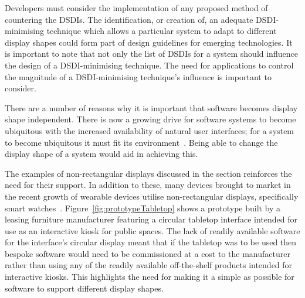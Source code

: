 \documentclass{bmcart}
\begin{document}
Developers must consider the implementation of any proposed method of countering the \acp{DSDI}.
The identification, or creation of, an adequate \ac{DSDI}-minimising technique which allows a particular system to adapt to different display shapes could form part of design guidelines for emerging technologies.
It is important to note that not only the list of \acp{DSDI} for a system should influence the design of a \ac{DSDI}-minimising technique.
The need for applications to control the magnitude of a \ac{DSDI}-minimising technique's influence is important to consider.


There are a number of reasons why it is important that software becomes display shape independent.
There is now a growing drive for software systems to become ubiquitous with the increased availability of natural user interfaces; for a system to become ubiquitous it must fit its environment~\cite{Greenfield2006}.
Being able to change the display shape of a system would aid in achieving this.


The examples of non-rectangular displays discussed in the  section reinforces the need for their support.
In addition to these, many devices brought to market in the recent growth of wearable devices utilise non-rectangular displays, specifically smart watches~\cite{Jung2016}.
Figure~\ref{fig:prototypeTabletop} shows a prototype built by a leasing furniture manufacturer featuring a circular tabletop interface intended for use as an interactive kiosk for public spaces.
The lack of readily available software for the interface's circular display meant that if the tabletop was to be used then bespoke software would need to be commissioned at a cost to the manufacturer rather than using any of the readily available off-the-shelf products intended for interactive kiosks.
This highlights the need for making it a simple as possible for software to support different display shapes.

\end{document}
